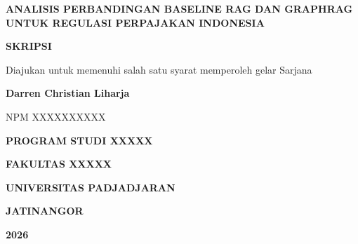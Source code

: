 \thispagestyle{empty}
\begin{center}
  {\bfseries\MakeUppercase{Analisis Perbandingan Baseline RAG dan GraphRAG untuk Regulasi Perpajakan Indonesia}\par}
  \vspace{1cm}
  {\bfseries SKRIPSI\par}
  \vspace{0.5cm}
  {Diajukan untuk memenuhi salah satu syarat memperoleh gelar Sarjana\par}
  \vfill

  \vspace{1cm}

  {\bfseries Darren Christian Liharja\par}
  {NPM XXXXXXXXXX\par}
  \vfill

  {\bfseries\MakeUppercase{Program Studi XXXXX}\par}
  {\bfseries\MakeUppercase{Fakultas XXXXX}\par}
  {\bfseries UNIVERSITAS PADJADJARAN\par}
  {\bfseries JATINANGOR\par}
  {\bfseries 2026\par}
\end{center}
